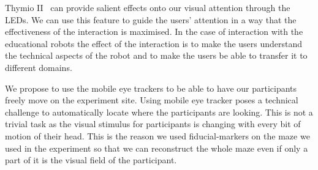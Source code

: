 \documentclass{sig-alternate}
\begin{document}
Thymio II~\cite{riedo2012two} can provide salient effects onto our visual
attention through the LEDs. We can use this feature to guide the users'
attention in a way that the effectiveness of the interaction is maximised. In
the case of interaction with the educational robots the effect of the
interaction is to make the users understand the technical aspects of the robot
and to make the users be able to transfer it to different domains.

We propose to use the mobile eye trackers to be able to have our participants
freely move on the experiment site. Using mobile eye tracker poses a technical
challenge to automatically locate where the participants are looking. This is
not a trivial task as the visual stimulus for participants is changing with
every bit of motion of their head. This is the reason we used fiducial-markers
on the maze we used in the experiment so that we can reconstruct the whole maze
even if only a part of it is the visual field of the participant.

%
%
%
%
\end{document}
